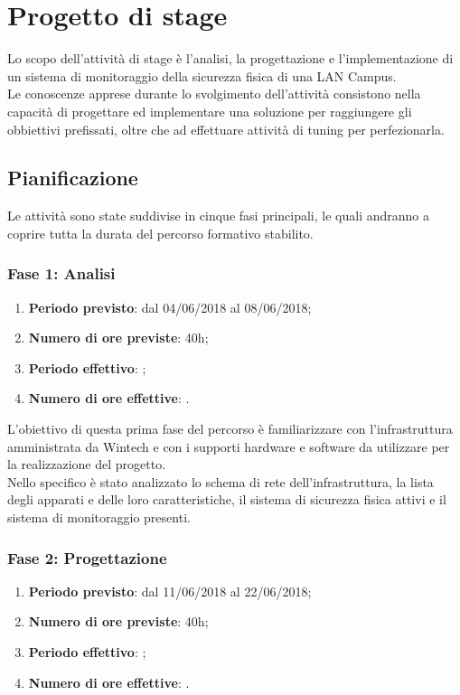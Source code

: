 \documentclass[Tesi.tex]{subfiles}
\begin{document}
\chapter{Progetto di stage}
Lo scopo dell'attività di stage è l’analisi, la progettazione e l'implementazione di un sistema di monitoraggio della sicurezza fisica di una LAN Campus. \\
Le conoscenze apprese durante lo svolgimento dell'attività consistono nella capacità di progettare ed implementare una soluzione per raggiungere gli obbiettivi prefissati, oltre che ad effettuare attività di tuning per perfezionarla.


\section{Pianificazione}
Le attività sono state suddivise in cinque fasi principali, le quali andranno a coprire tutta la durata del percorso formativo stabilito.

\subsection{Fase 1: Analisi}
\begin{enumerate}
	\item \textbf{Periodo previsto}: dal 04/06/2018 al 08/06/2018;
	\item \textbf{Numero di ore previste}: 40h;
	\item \textbf{Periodo effettivo}: ;
	\item \textbf{Numero di ore effettive}: .
\end{enumerate}

L'obiettivo di questa prima fase del percorso è familiarizzare con l'infrastruttura amministrata da Wintech e con i supporti hardware e software da utilizzare per la realizzazione del progetto. \\
Nello specifico è stato analizzato lo schema di rete dell'infrastruttura, la lista degli apparati e delle loro caratteristiche, il sistema di sicurezza fisica attivi e il sistema di monitoraggio presenti. 

\subsection{Fase 2: Progettazione}
\begin{enumerate}
	\item \textbf{Periodo previsto}: dal 11/06/2018 al 22/06/2018;
	\item \textbf{Numero di ore previste}: 40h;
	\item \textbf{Periodo effettivo}: ;
	\item \textbf{Numero di ore effettive}: .
	
	
\end{enumerate}
\end{document}
